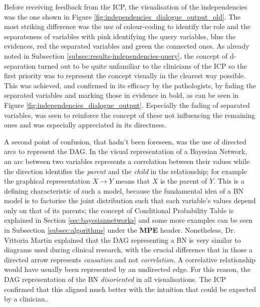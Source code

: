 Before receiving feedback from the ICP, the visualisation of the independencies was the one shown in Figure \ref{fig:independencies_dialogue_output_old}.
The most striking difference was the use of colour-coding to identify the role and the separateness of variables with pink identifying the query variables, blue the evidences, red the separated variables and green the connected ones.
As already noted in Subsection \ref{subsec:results-independencies-query}, the concept of d-separation turned out to be quite unfamiliar to the clinicians of the ICP so the first priority was to represent the concept visually in the clearest way possible.
This was achieved, and confirmed in its efficacy by the pathologists, by fading the separated variables and marking those in evidence in bold, as can be seen in Figure \ref{fig:independencies_dialogue_output}.
Especially the fading of separated variables, was seen to reinforce the concept of these not influencing the remaining ones and was especially appreciated in its directness.

A second point of confusion, that hadn't been foreseen, was the use of directed arcs to represent the DAG.
In the visual representation of a Bayesian Network, an arc between two variables represents a correlation between their values while the direction identifies the \textit{parent} and the \textit{child} in the relationship; for example the graphical representation $X \rightarrow Y$ means that $X$ is the parent of $Y$.
This is a defining characteristic of such a model, because the fundamental idea of a BN model is to factorise the joint distribution such that each variable's values depend only on that of its parents; the concept of Conditional Probability Table is explained in Section \ref{sec:bayesiannetworks} and some more examples can be seen in Subsection \ref{subsec:algorithms} under the \textbf{MPE} header.
Nonetheless, Dr. Vittoria Martin explained that the DAG representing a BN is very similar to diagrams used during clinical research, with the crucial difference that in those a directed arrow represents \textit{causation} and not \textit{correlation}.
A correlative relationship would have usually been represented by an undirected edge.
For this reason, the DAG representation of the BN \textit{disoriented} in all visualisations.
The ICP confirmed that this aligned much better with the intuition that could be expected by a clinician..

